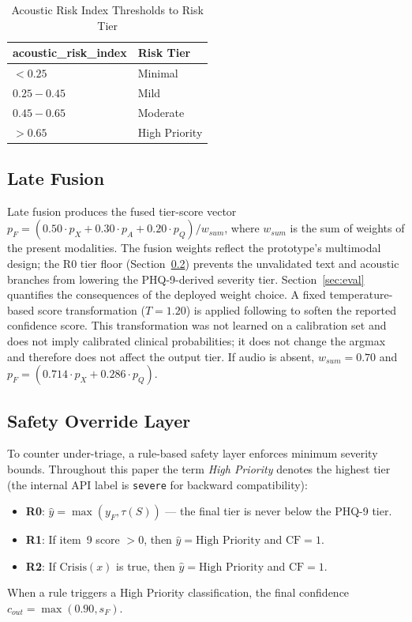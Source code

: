 \documentclass[conference]{IEEEtran}
\begin{document}
\begin{table}[htbp]
\caption{Acoustic Risk Index Thresholds to Risk Tier}
\label{tab:audio_map}
\centering
\begin{tabular}{ll}
\toprule
\textbf{acoustic\_risk\_index} & \textbf{Risk Tier} \\
\midrule
$< 0.25$ & Minimal \\
$0.25 - 0.45$ & Mild \\
$0.45 - 0.65$ & Moderate \\
$> 0.65$ & High Priority \\
\bottomrule
\end{tabular}
\end{table}

\subsection{Late Fusion}
Late fusion produces the fused tier-score vector $p_F = (0.50 \cdot p_X + 0.30 \cdot p_A + 0.20 \cdot p_Q) / w_{sum}$, where $w_{sum}$ is the sum of weights of the present modalities. The fusion weights reflect the prototype's multimodal design; the R0 tier floor (Section~\ref{sec:safety}) prevents the unvalidated text and acoustic branches from lowering the PHQ-9-derived severity tier. Section~\ref{sec:eval} quantifies the consequences of the deployed weight choice. A fixed temperature-based score transformation ($T=1.20$) is applied following \cite{guo_calibration} to soften the reported confidence score. This transformation was not learned on a calibration set and does not imply calibrated clinical probabilities; it does not change the argmax and therefore does not affect the output tier. If audio is absent, $w_{sum}=0.70$ and $p_F = (0.714 \cdot p_X + 0.286 \cdot p_Q)$.

\subsection{Safety Override Layer}
\label{sec:safety}
To counter under-triage, a rule-based safety layer enforces minimum severity bounds. Throughout this paper the term \emph{High Priority} denotes the highest tier (the internal API label is \texttt{severe} for backward compatibility):
\begin{itemize}
    \item \textbf{R0}: $\hat{y} = \max(y_F, \tau(S))$ --- the final tier is never below the PHQ-9 tier.
    \item \textbf{R1}: If item~9 score $>0$, then $\hat{y} = \text{High Priority}$ and $\text{CF}=1$.
    \item \textbf{R2}: If $\text{Crisis}(x)$ is true, then $\hat{y} = \text{High Priority}$ and $\text{CF}=1$.
\end{itemize}
When a rule triggers a High Priority classification, the final confidence $c_{out} = \max(0.90, s_F)$.
\end{document}
